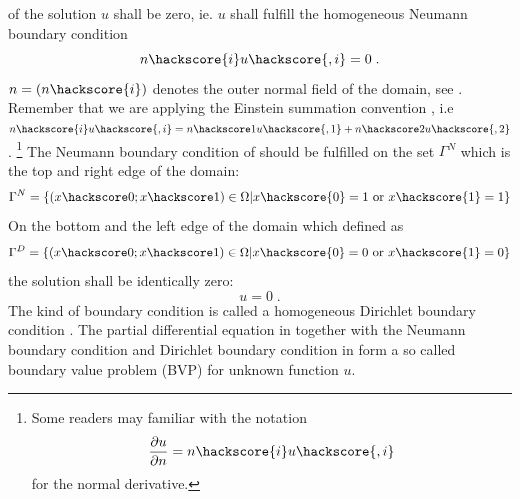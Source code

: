 of the solution $u$ shall be zero, ie. $u$ shall fulfill
the homogeneous Neumann boundary condition
\begin{equation}
n\hackscore{i} u\hackscore{,i}= 0 \;.
\label{eq:FirstSteps.2}
\end{equation}
$n=(n\hackscore{i})$ denotes the outer normal field
of the domain, see . Remember that we 
are applying the Einstein summation convention , i.e
$n\hackscore{i} u\hackscore{,i}= n\hackscore1 u\hackscore{,1} +
n\hackscore2 u\hackscore{,2}$. 
\footnote{Some readers may familiar with the notation
\begin{equation*}
\frac{\partial u}{\partial n} = n\hackscore{i} u\hackscore{,i}
\end{equation*}
for the normal derivative.}
The Neumann boundary condition of  should be fulfilled on the
set $\Gamma^N$ which is the top and right edge of the domain:
\begin{equation}
\Gamma^N=\{(x\hackscore 0;x\hackscore 1) \in \Omega | x\hackscore{0}=1 \mbox{ or } x\hackscore{1}=1  \}
\label{eq:FirstSteps.2b}
\end{equation}
On the bottom and the left edge of the domain which defined
as 
\begin{equation}
\Gamma^D=\{(x\hackscore 0;x\hackscore 1) \in \Omega | x\hackscore{0}=0 \mbox{ or } x\hackscore{1}=0  \}
\label{eq:FirstSteps.2c}
\end{equation}
the solution shall be identically zero:
\begin{equation}
u=0 \; .
\label{eq:FirstSteps.2d}
\end{equation}
The kind of boundary condition is called a homogeneous Dirichlet boundary condition
. The partial differential equation in  together
with the Neumann boundary condition  and 
Dirichlet boundary condition in  form a so
called boundary value
problem (BVP) for unknown
function $u$. 



